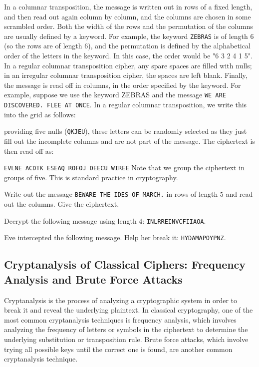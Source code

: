 \documentclass[11pt,a4paper]{report}
\begin{document}
In a columnar transposition, the message is written out in rows of a fixed length, and then read out again column by column, and the columns are chosen in some scrambled order.
Both the width of the rows and the permutation of the columns are usually defined by a keyword.
For example, the keyword \verb|ZEBRAS| is of length 6 (so the rows are of length 6), and the permutation is defined by the alphabetical order of the letters in the keyword.
In this case, the order would be "6 3 2 4 1 5".
In a regular columnar transposition cipher, any spare spaces are filled with nulls;
in an irregular columnar transposition cipher, the spaces are left blank.
Finally, the message is read off in columns, in the order specified by the keyword.
For example, suppose we use the keyword ZEBRAS and the message \verb|WE ARE DISCOVERED. FLEE AT ONCE|.
In a regular columnar transposition, we write this into the grid as follows:

providing five nulls (\verb|QKJEU|), these letters can be randomly selected as they just fill out the incomplete columns and are not part of the message.
The ciphertext is then read off as:

\verb|EVLNE ACDTK ESEAQ ROFOJ DEECU WIREE|
Note that  we group the ciphertext in groups of five. This is standard practice in cryptography.
\begin{ex}
Write out the message
\verb|BEWARE THE IDES OF MARCH.|
in rows of length 5 and read out the columns.
Give the ciphertext.
\end{ex}

\begin{ex}
Decrypt the following message using length 4: \verb|INLRREINVCFIIAOA|.
\end{ex}

\begin{ex}
Eve intercepted the following message. Help her break it: \verb|HYDAMAPOYPNZ|.
\end{ex}




\subsection{Cryptanalysis of Classical Ciphers: Frequency Analysis and Brute Force Attacks}

Cryptanalysis is the process of analyzing a cryptographic system in order to break it and reveal the underlying plaintext.
In classical cryptography, one of the most common cryptanalysis techniques is frequency analysis, which involves analyzing the frequency of letters or symbols in the ciphertext to determine the underlying substitution or transposition rule.
Brute force attacks, which involve trying all possible keys until the correct one is found, are another common cryptanalysis technique.
\end{document}
